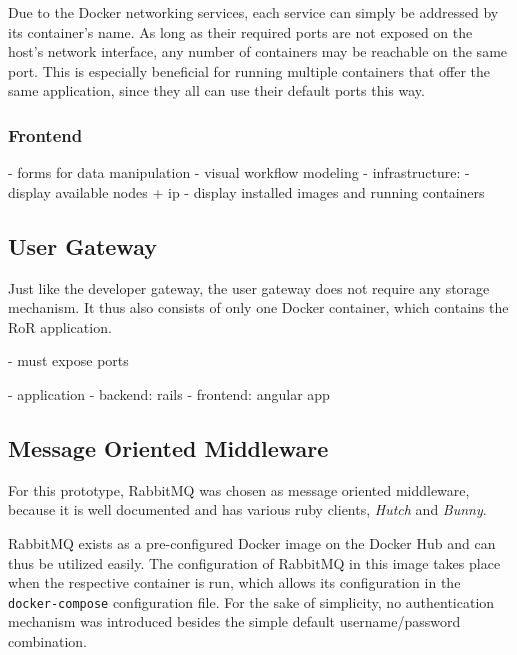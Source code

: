         Due to the Docker networking services, each service can simply be addressed by its container's name. As long as their required ports are not exposed on the host's network interface, any number of containers may be reachable on the same port. This is especially beneficial for running multiple containers that offer the same application, since they all can use their default ports this way.

      \subsubsection{Frontend} %
        \label{ssub:frontend}
          - forms for data manipulation
          - visual workflow modeling
          - infrastructure:
            - display available nodes + ip
            - display installed images and running containers


  \subsection{User Gateway} %
    \label{sub:user_gateway}
    Just like the developer gateway, the user gateway does not require any storage mechanism. It thus also consists of only one Docker container, which contains the \ac{RoR} application.

    - must expose ports

      - application
        - backend: rails
        - frontend: angular app

  \subsection{Message Oriented Middleware} %
    \label{sub:message_oriented_middleware}
      For this prototype, RabbitMQ was chosen as message oriented middleware, because it is well documented and has various ruby clients, \eg \emph{Hutch} and \emph{Bunny}.

      RabbitMQ exists as a pre-configured Docker image on the Docker Hub and can thus be utilized easily. The configuration of RabbitMQ in this image takes place when the respective container is run, which allows its configuration in the \texttt{docker-compose} configuration file.
      For the sake of simplicity, no authentication mechanism was introduced besides the simple default username/password combination.

